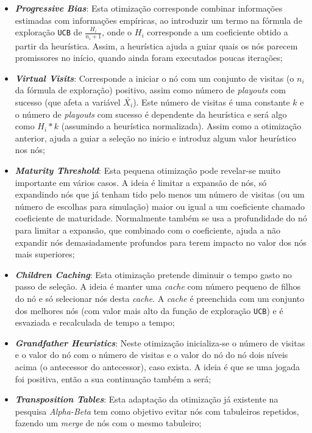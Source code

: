 \documentclass[12pt,a4paper,oneside]{article}
\begin{document}
\begin{itemize}
\item \textbf{\textit{Progressive Bias}}: Esta otimização corresponde
  combinar informações estimadas com informações empíricas, ao
  introduzir um termo na fórmula de exploração \texttt{UCB} de
  $\frac{H_i}{n_i + 1}$, onde o $H_i$ corresponde a um coeficiente
  obtido a partir da heurística. Assim, a heurística ajuda a guiar
  quais os nós parecem promissores no início, quando ainda foram
  executados poucas iterações;
\item \textbf{\textit{Virtual Visits}}: Corresponde a iniciar o nó com
  um conjunto de visitas (o $n_i$ da fórmula de exploração) positivo,
  assim como número de \textit{playouts} com sucesso (que afeta a
  variável $\bar{X_i}$). Este número de visitas é uma constante $k$ e
  o número de \textit{playouts} com sucesso é dependente da heurística
  e será algo como $H_i * k$ (assumindo a heurística
  normalizada). Assim como a otimização anterior, ajuda a guiar a
  seleção no inicio e introduz algum valor heurístico nos nós;
\item \textbf{\textit{Maturity Threshold}}: Esta pequena otimização
  pode revelar-se muito importante em vários casos. A ideia é limitar
  a expansão de nós, só expandindo nós que já tenham tido pelo menos
  um número de visitas (ou um número de escolhas para simulação) maior
  ou igual a um coeficiente chamado coeficiente de
  maturidade. Normalmente também se usa a profundidade do nó para
  limitar a expansão, que combinado com o coeficiente, ajuda a não
  expandir nós demasiadamente profundos para terem impacto no valor
  dos nós mais superiores;
\item \textbf{\textit{Children Caching}}: Esta otimização pretende
  diminuir o tempo gasto no passo de seleção. A ideia é manter uma
  \textit{cache} com número pequeno de filhos do nó e só selecionar
  nós desta \textit{cache}. A \textit{cache} é preenchida com um
  conjunto dos melhores nós (com valor mais alto da função de
  exploração \texttt{UCB}) e é esvaziada e recalculada de tempo a
  tempo;
\item \textbf{\textit{Grandfather Heuristics}}: Neste otimização
  inicializa-se o número de visitas e o valor do nó com o número de
  visitas e o valor do nó do nó dois níveis acima (o antecessor do
  antecessor), caso exista. A ideia é que se uma jogada foi positiva,
  então a sua continuação também a será;
\item \textbf{\textit{Transposition Tables}}: Esta adaptação da
  otimização já existente na pesquisa \textit{Alpha-Beta} tem como
  objetivo evitar nós com tabuleiros repetidos, fazendo um
  \textit{merge} de nós com o mesmo tabuleiro;
\end{itemize}
\end{document}
